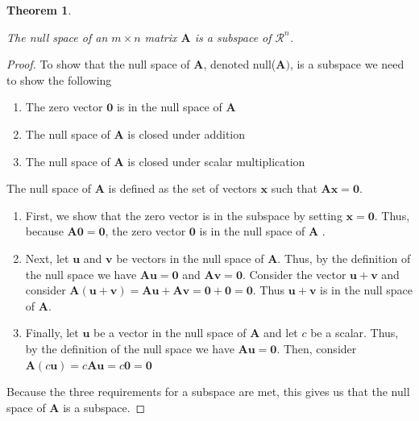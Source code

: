 \documentclass[
]{book}
\newtheorem{theorem}{Theorem}[chapter]
\theoremstyle{definition}
\theoremstyle{definition}
\theoremstyle{definition}
\theoremstyle{remark}
\begin{document}
\begin{theorem}
\protect\hypertarget{thm:unlabeled-div-118}{}\label{thm:unlabeled-div-118}

The null space of an \(m \times n\) matrix \(\mathbf{A}\) is a subspace of \(\mathcal{R}^n\).

\end{theorem}

\begin{proof}

To show that the null space of \(\mathbf{A}\), denoted null(\(\mathbf{A})\), is a subspace we need to show the following

\begin{enumerate}
\def\labelenumi{\arabic{enumi})}
\item
  The zero vector \(\mathbf{0}\) is in the null space of \(\mathbf{A}\)
\item
  The null space of \(\mathbf{A}\) is closed under addition
\item
  The null space of \(\mathbf{A}\) is closed under scalar multiplication
\end{enumerate}

The null space of \(\mathbf{A}\) is defined as the set of vectors \(\mathbf{x}\) such that \(\mathbf{A} \mathbf{x} = \mathbf{0}\).

\begin{enumerate}
\def\labelenumi{\arabic{enumi})}
\item
  First, we show that the zero vector is in the subspace by setting \(\mathbf{x} = \mathbf{0}\). Thus, because \(\mathbf{A} \mathbf{0} = \mathbf{0}\), the zero vector \(\mathbf{0}\) is in the null space of \(\mathbf{A}\) .
\item
  Next, let \(\mathbf{u}\) and \(\mathbf{v}\) be vectors in the null space of \(\mathbf{A}\). Thus, by the definition of the null space we have \(\mathbf{A} \mathbf{u} = \mathbf{0}\) and \(\mathbf{A} \mathbf{v} = \mathbf{0}\). Consider the vector \(\mathbf{u} + \mathbf{v}\) and consider \(\mathbf{A} (\mathbf{u} + \mathbf{v}) = \mathbf{A} \mathbf{u} + \mathbf{A} \mathbf{v} = \mathbf{0} + \mathbf{0} = \mathbf{0}\). Thus \(\mathbf{u} + \mathbf{v}\) is in the null space of \(\mathbf{A}\).
\item
  Finally, let \(\mathbf{u}\) be a vector in the null space of \(\mathbf{A}\) and let \(c\) be a scalar. Thus, by the definition of the null space we have \(\mathbf{A} \mathbf{u} = \mathbf{0}\). Then, consider \(\mathbf{A} (c \mathbf{u}) = c \mathbf{A} \mathbf{u} = c \mathbf{0} = \mathbf{0}\)
\end{enumerate}

Because the three requirements for a subspace are met, this gives us that the null space of \(\mathbf{A}\) is a subspace.

\end{proof}
\end{document}
